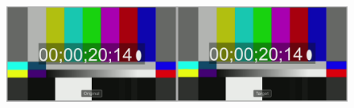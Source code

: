 \begin{figure}[htbp]
  \begin{center}
    \includegraphics[bb=0 0 1920 540,width=14cm]{img/evaluate-delay-hardware.png}
  \end{center}
  \caption[ハードウェア実装による遅延計測のキャプチャー画像]{}
  \label{fig:evaluate-delay-hardware}
\end{figure}

